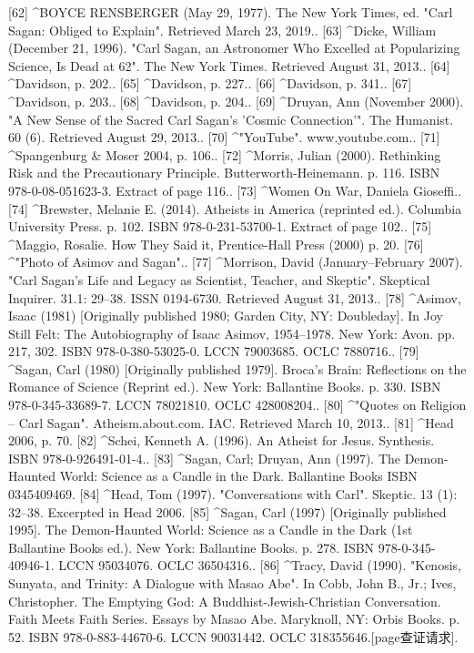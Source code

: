 [62]
^BOYCE RENSBERGER (May 29, 1977). The New York Times, ed. "Carl Sagan: Obliged to Explain". Retrieved March 23, 2019..
[63]
^Dicke, William (December 21, 1996). "Carl Sagan, an Astronomer Who Excelled at Popularizing Science, Is Dead at 62". The New York Times. Retrieved August 31, 2013..
[64]
^Davidson, p. 202..
[65]
^Davidson, p. 227..
[66]
^Davidson, p. 341..
[67]
^Davidson, p. 203..
[68]
^Davidson, p. 204..
[69]
^Druyan, Ann (November 2000). "A New Sense of the Sacred Carl Sagan's 'Cosmic Connection'". The Humanist. 60 (6). Retrieved August 29, 2013..
[70]
^"YouTube". www.youtube.com..
[71]
^Spangenburg & Moser 2004, p. 106..
[72]
^Morris, Julian (2000). Rethinking Risk and the Precautionary Principle. Butterworth-Heinemann. p. 116. ISBN 978-0-08-051623-3. Extract of page 116..
[73]
^Women On War, Daniela Gioseffi..
[74]
^Brewster, Melanie E. (2014). Atheists in America (reprinted ed.). Columbia University Press. p. 102. ISBN 978-0-231-53700-1. Extract of page 102..
[75]
^Maggio, Rosalie. How They Said it, Prentice-Hall Press (2000) p. 20.
[76]
^"Photo of Asimov and Sagan"..
[77]
^Morrison, David (January–February 2007). "Carl Sagan's Life and Legacy as Scientist, Teacher, and Skeptic". Skeptical Inquirer. 31.1: 29–38. ISSN 0194-6730. Retrieved August 31, 2013..
[78]
^Asimov, Isaac (1981) [Originally published 1980; Garden City, NY: Doubleday]. In Joy Still Felt: The Autobiography of Isaac Asimov, 1954–1978. New York: Avon. pp. 217, 302. ISBN 978-0-380-53025-0. LCCN 79003685. OCLC 7880716..
[79]
^Sagan, Carl (1980) [Originally published 1979]. Broca's Brain: Reflections on the Romance of Science (Reprint ed.). New York: Ballantine Books. p. 330. ISBN 978-0-345-33689-7. LCCN 78021810. OCLC 428008204..
[80]
^"Quotes on Religion – Carl Sagan". Atheism.about.com. IAC. Retrieved March 10, 2013..
[81]
^Head 2006, p. 70.
[82]
^Schei, Kenneth A. (1996). An Atheist for Jesus. Synthesis. ISBN 978-0-926491-01-4..
[83]
^Sagan, Carl; Druyan, Ann (1997). The Demon-Haunted World: Science as a Candle in the Dark. Ballantine Books ISBN 0345409469.
[84]
^Head, Tom (1997). "Conversations with Carl". Skeptic. 13 (1): 32–38. Excerpted in Head 2006.
[85]
^Sagan, Carl (1997) [Originally published 1995]. The Demon-Haunted World: Science as a Candle in the Dark (1st Ballantine Books ed.). New York: Ballantine Books. p. 278. ISBN 978-0-345-40946-1. LCCN 95034076. OCLC 36504316..
[86]
^Tracy, David (1990). "Kenosis, Sunyata, and Trinity: A Dialogue with Masao Abe". In Cobb, John B., Jr.; Ives, Christopher. The Emptying God: A Buddhist-Jewish-Christian Conversation. Faith Meets Faith Series. Essays by Masao Abe. Maryknoll, NY: Orbis Books. p. 52. ISBN 978-0-883-44670-6. LCCN 90031442. OCLC 318355646.[page查证请求].
